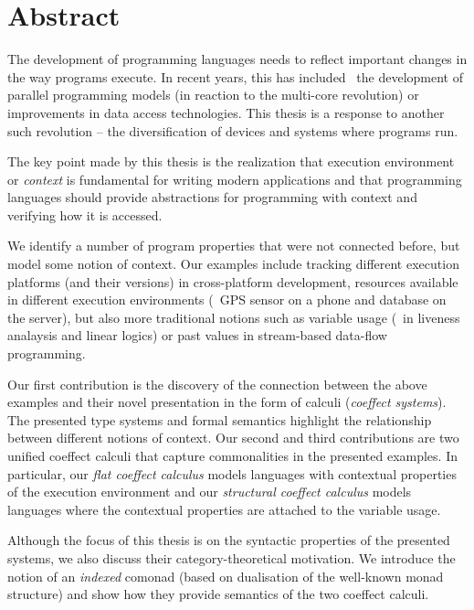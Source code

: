 
\begingroup
\let\clearpage\relax
\let\cleardoublepage\relax
\let\cleardoublepage\relax

\chapter*{Abstract} %
The development of programming languages needs to reflect important changes in the way
programs execute. In recent years, this has included \eg~the development of parallel programming 
models (in reaction to the multi-core revolution) or improvements in data access technologies. 
This thesis is a response to another such revolution -- the diversification of devices and 
systems where programs run. 

The key point made by this thesis is the realization that execution environment or
\emph{context} is fundamental for writing modern applications and that programming 
languages should provide abstractions for programming with context and verifying how 
it is accessed. 

We identify a number of program properties that were not connected before, but model some notion 
of context. Our examples include tracking different execution platforms (and their versions) 
in cross-platform development, resources available in different execution environments (\eg~GPS
sensor on a phone and database on the server), but also more traditional notions such as 
variable usage (\eg~in liveness analaysis and linear logics) or past values in 
stream-based data-flow programming.

Our first contribution is the discovery of the connection between the above examples and
their novel presentation in the form of calculi (\emph{coeffect systems}). The presented type 
systems and formal semantics highlight the relationship between different notions of context. 
Our second and third contributions are two unified coeffect calculi that capture commonalities 
in the presented examples. In particular, our \emph{flat coeffect calculus} models languages 
with contextual properties of the execution environment and our \emph{structural coeffect 
calculus} models languages where the contextual properties are attached to the variable usage.

Although the focus of this thesis is on the syntactic properties of the presented 
systems, we also discuss their category-theoretical motivation. We introduce the notion of
an \emph{indexed} comonad (based on dualisation of the well-known monad structure) and show 
how they provide semantics of the two coeffect calculi. 

\endgroup			

\vfill